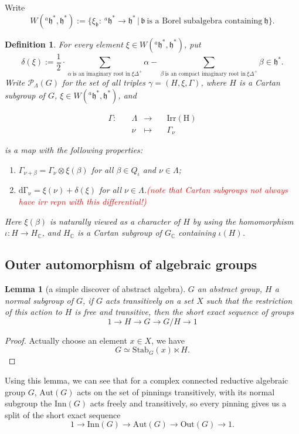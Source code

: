 \documentclass[12pt]{amsart}
\numberwithin{equation}{section}
\newtheorem{lem}[thm]{Lemma}
\newtheorem{defn}[thm]{Definition}
\newcommand{\BC}{{\mathbb {C}}}
\newcommand{\fb}{\mathfrak{b}}
\newcommand{\fh}{\mathfrak{h}}
\newcommand{\Aut}{{\mathrm{Aut}}}
\newcommand{\Inn}{{\mathrm{Inn}}}
\newcommand{\Out}{{\mathrm{Out}}}
\newcommand{\set}[2]{\{#1\,|\,#2\}}
\newcommand{\defmap}[5]{
           \begin{equation*}
              \begin{aligned}
                   #1:\quad  & #2 &\longrightarrow &\quad #3 \\
                      \quad  & #4    &\longmapsto  &\quad #5
              \end{aligned}
           \end{equation*}
          }
\newcommand{\shortexact}[5]{#1\rightarrow #2 \rightarrow #3 \rightarrow #4\rightarrow #5}
\begin{document}
Write $$W(^{a}\fh^*,\fh^*) :=  \set{\xi_{\fb}: \ ^{a}\fh^* \to \fh^*}{\fb \ \textrm{is a Borel subalgebra containing} \ \fh}.$$

\begin{defn}
  For every element $\xi \in W(^{a}\fh^*,\fh^*)$, put
  $$\delta(\xi) := \frac{1}{2} \cdot \sum\limits_{\alpha  \ \textrm{is an imaginary root in} \ \xi\Delta^+}\alpha - \sum\limits_{\beta \ \textrm{is an compact imaginary root in} \ \xi\Delta^+}\beta \in \fh^* .$$
  Write $\mathcal{P} _{\Lambda}(G)$ for the set of all triples $\gamma = (H,\xi,\Gamma)$, where
  $H$ is a Cartan subgroup of $G$, $\xi \in W(^{a}\fh^*,\fh^*)$, and
  \defmap{\Gamma}{\Lambda}{\mathrm{Irr(H)}}{\nu}{\Gamma_{\nu}}
  is a map with the following properties:
  \begin{enumerate}
    \item $\Gamma_{\nu+\beta} = \Gamma_{\nu} \otimes \xi(\beta)$ for all $\beta \in Q_{\iota}$ and $\nu \in \Lambda$;
    \item $\mathrm{d\Gamma_{\nu}} = \xi(\nu) + \delta(\xi)$ for all $\nu \in \Lambda$.\textcolor{red}{(note that Cartan subgroups not always have irr repn with this differential!)}
  \end{enumerate}
  Here $\xi(\beta)$ is naturally viewed as a character of $H$ by using the homomorphism
  $\iota : H \to H_{\BC}$, and $H_{\BC}$ is a Cartan subgroup of $G_{\BC}$ containing $\iota(H)$.
\end{defn}

\newpage

\subsection{Outer automorphism of algebraic groups}

\begin{lem}[a simple discover of abstract algebra]
  $G$ an abstract group, $H$ a normal subgroup of $G$, if $G$ acts
  transitively on a set $X$ such that the restriction of this action
  to $H$ is free and transitive, then the short exact sequence of groups
  $$\shortexact{1}{H}{G}{G/H}{1}$$
\end{lem}

\begin{proof}
  Actually choose an element $x \in X$, we have
  $$ G \simeq \mathrm{Stab}_{G}(x) \ltimes H.$$
\end{proof}


Using this lemma, we can see that for a complex connected reductive
algebraic group $G$, $\Aut(G)$ acts on the set of pinnings transitively,
with its normal subgroup the $\Inn(G)$ acts freely and transitively,
so every pinning gives us a split of the short exact sequence
$$\shortexact{1}{\Inn(G)}{\Aut(G)}{\Out(G)}{1}.$$
\end{document}
